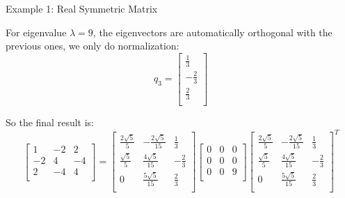\documentclass{beamer}
\begin{document}
\begin{frame}{Example 1: Real Symmetric Matrix}

\vspace{3pt}
For eigenvalue $\lambda=9$, the eigenvectors are automatically orthogonal with the previous ones, we only do normalization:
\begin{equation*}
    q_3=\left[ \begin{array}{c}
        \frac{1}{3}\\
        -\frac{2}{3}\\
        \frac{2}{3}\\
    \end{array} \right]
\end{equation*}

So the final result is:
\begin{equation*}
    \left[ \begin{matrix}
        1&		-2&		2\\
        -2&		4&		-4\\
        2&		-4&		4\\
    \end{matrix} \right] =\left[ \begin{matrix}
        \frac{2\sqrt{5}}{5}&		-\frac{2\sqrt{5}}{15}&		\frac{1}{3}\\
        \frac{\sqrt{5}}{5}&		\frac{4\sqrt{5}}{15}&		-\frac{2}{3}\\
        0&		\frac{5\sqrt{5}}{15}&		\frac{2}{3}\\
    \end{matrix} \right] \left[ \begin{matrix}
        0&		0&		0\\
        0&		0&		0\\
        0&		0&		9\\
    \end{matrix} \right] \left[ \begin{matrix}
        \frac{2\sqrt{5}}{5}&		-\frac{2\sqrt{5}}{15}&		\frac{1}{3}\\
        \frac{\sqrt{5}}{5}&		\frac{4\sqrt{5}}{15}&		-\frac{2}{3}\\
        0&		\frac{5\sqrt{5}}{15}&		\frac{2}{3}\\
    \end{matrix} \right] ^T
\end{equation*}

\end{frame}
\end{document}
